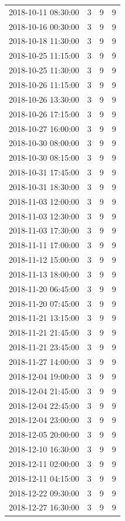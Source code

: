 \begin{tabular}{lrrr}
2018-10-11 08:30:00 & 3 & 9 & 9 \\
2018-10-16 00:30:00 & 3 & 9 & 9 \\
2018-10-18 11:30:00 & 3 & 9 & 9 \\
2018-10-25 11:15:00 & 3 & 9 & 9 \\
2018-10-25 11:30:00 & 3 & 9 & 9 \\
2018-10-26 11:15:00 & 3 & 9 & 9 \\
2018-10-26 13:30:00 & 3 & 9 & 9 \\
2018-10-26 17:15:00 & 3 & 9 & 9 \\
2018-10-27 16:00:00 & 3 & 9 & 9 \\
2018-10-30 08:00:00 & 3 & 9 & 9 \\
2018-10-30 08:15:00 & 3 & 9 & 9 \\
2018-10-31 17:45:00 & 3 & 9 & 9 \\
2018-10-31 18:30:00 & 3 & 9 & 9 \\
2018-11-03 12:00:00 & 3 & 9 & 9 \\
2018-11-03 12:30:00 & 3 & 9 & 9 \\
2018-11-03 17:30:00 & 3 & 9 & 9 \\
2018-11-11 17:00:00 & 3 & 9 & 9 \\
2018-11-12 15:00:00 & 3 & 9 & 9 \\
2018-11-13 18:00:00 & 3 & 9 & 9 \\
2018-11-20 06:45:00 & 3 & 9 & 9 \\
2018-11-20 07:45:00 & 3 & 9 & 9 \\
2018-11-21 13:15:00 & 3 & 9 & 9 \\
2018-11-21 21:45:00 & 3 & 9 & 9 \\
2018-11-21 23:45:00 & 3 & 9 & 9 \\
2018-11-27 14:00:00 & 3 & 9 & 9 \\
2018-12-04 19:00:00 & 3 & 9 & 9 \\
2018-12-04 21:45:00 & 3 & 9 & 9 \\
2018-12-04 22:45:00 & 3 & 9 & 9 \\
2018-12-04 23:00:00 & 3 & 9 & 9 \\
2018-12-05 20:00:00 & 3 & 9 & 9 \\
2018-12-10 16:30:00 & 3 & 9 & 9 \\
2018-12-11 02:00:00 & 3 & 9 & 9 \\
2018-12-11 04:15:00 & 3 & 9 & 9 \\
2018-12-22 09:30:00 & 3 & 9 & 9 \\
2018-12-27 16:30:00 & 3 & 9 & 9 \\

\end{tabular}
